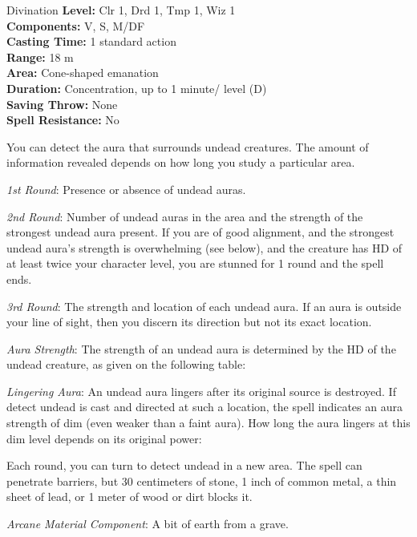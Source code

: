{Divination}
{
	\textbf{Level:}
	Clr 1, Drd 1, Tmp 1, Wiz 1\\
	\textbf{Components:}
	V, S, M/DF\\
	\textbf{Casting Time:}
	1 standard action\\
	\textbf{Range:}
	18 m\\
	\textbf{Area:}
	Cone-shaped emanation\\
	\textbf{Duration:}
	Concentration, up to 1 minute/ level (D)\\
	\textbf{Saving Throw:}
	None\\
	\textbf{Spell Resistance:}
	No\\
}
{
	You can detect the aura that surrounds undead creatures. The amount of information revealed depends on how long you study a particular area.

	\textit{1st Round}:
	Presence or absence of undead auras.

	\textit{2nd Round}:
	Number of undead auras in the area and the strength of the strongest undead aura present. If you are of good alignment, and the strongest undead aura's strength is overwhelming (see below), and the creature has HD of at least twice your character level, you are stunned for 1 round and the spell ends.

	\textit{3rd Round}:
	The strength and location of each undead aura. If an aura is outside your line of sight, then you discern its direction but not its exact location.

	\textit{Aura Strength}:
	The strength of an undead aura is determined by the HD of the undead creature, as given on the following table:

	\textit{Lingering Aura}:
	An undead aura lingers after its original source is destroyed. If detect undead is cast and directed at such a location, the spell indicates an aura strength of dim (even weaker than a faint aura). How long the aura lingers at this dim level depends on its original power:

	Each round, you can turn to detect undead in a new area. The spell can penetrate barriers, but 30 centimeters of stone, 1 inch of common metal, a thin sheet of lead, or 1 meter of wood or dirt blocks it.

	\textit{Arcane Material Component}:
	A bit of earth from a grave.

}
